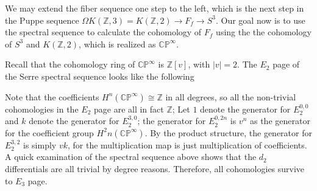 \documentclass{article}
\theoremstyle{definition}
\theoremstyle{definition}
\theoremstyle{definition}
\theoremstyle{definition}
\theoremstyle{definition}
\theoremstyle{definition}
\theoremstyle{definition}
\begin{document}
We may extend the fiber sequence one step to the left, which is the next step in the Puppe sequence $\Omega K(\mathbb{Z},3)=K(\mathbb{Z},2)\to F_f\to S^3$. Our goal now is to use the spectral sequence to calculate the cohomology of $F_f$ using the the cohomology of $S^3$ and $K(\mathbb{Z},2)$, which is realized as $\mathbb{CP}^{\infty}$. 

Recall that the cohomology ring of $\mathbb{CP}^{\infty}$ is $\mathbb{Z}[v]$, with $|v|=2$. The $E_2$ page of the Serre spectral sequence looks like the following 


Note that the coefficients $H^n(\mathbb{CP}^{\infty})\cong \mathbb{Z}$ in all degrees, so all the non-trivial cohomologies in the $E_2$ page are all in fact $\mathbb{Z}$; Let $1$ denote the generator for $E_2^{0,0}$ and $k$ denote the generator for $E_2^{3,0}$; the generator for $E_2^{0,2n}$ is $v^n$ as the generator for the coefficient group $H^2n(\mathbb{CP}^{\infty})$. By the product structure, the generator for $E_2^{3,2}$ is simply $vk$, for the multiplication map is just multiplication of coefficients.
A quick examination of the spectral sequence above shows that the $d_2$ differentials are all trivial by degree reasons. Therefore, all cohomologies survive to $E_3$ page.
\end{document}
